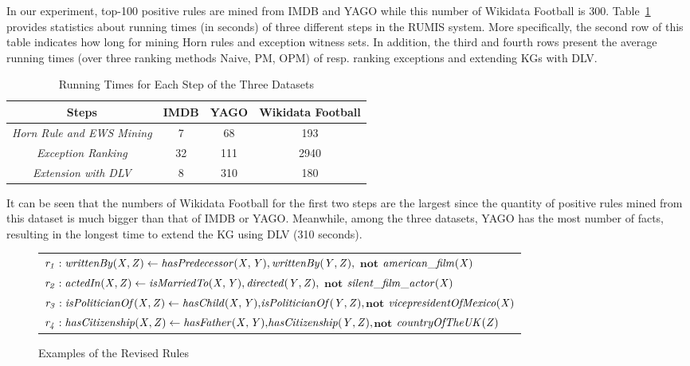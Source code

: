 In our experiment, top-100 positive rules are mined from IMDB and YAGO while this number of Wikidata Football is 300. Table~\ref{tab:run_time} provides statistics about running times (in seconds) of three different steps in the RUMIS system. More specifically, the second row of this table indicates how long for mining Horn rules and exception witness sets. In addition, the third and fourth rows present the average running times (over three ranking methods Naive, PM, OPM) of resp. ranking exceptions and extending KGs with DLV.

\begin{table}[ht]
\centering
\footnotesize{
\begin{tabular}{|c|ccc|}
\hline
\textbf{Steps} & \textbf{IMDB} & \textbf{YAGO} & \textbf{Wikidata Football}\\
\hline
 \textit{Horn Rule and EWS Mining} & 7 & 68 & 193\\
 \textit{Exception Ranking} & 32 & 111 & 2940\\
 \textit{Extension with DLV} & 8 & 310 & 180\\
 \hline 
\end{tabular}
}
\smallskip
\caption{Running Times for Each Step of the Three Datasets}
\label{tab:run_time}
\end{table}

It can be seen that the numbers of Wikidata Football for the first two steps are the largest since the quantity of positive rules mined from this dataset is much bigger than that of IMDB or YAGO. Meanwhile, among the three datasets, YAGO has the most number of facts, resulting in the longest time to extend the KG using DLV (310 seconds).

\begin{figure}[t]
    \centering
   
    \vspace{-.2cm}
    \begin{tabular}{l}
 {\scriptsize
        $\mathit{r_1: writtenBy(X, Z)}  \leftarrow
        \mathit{hasPredecessor(X, Y)},\mathit{writtenBy(Y, Z)},$ $ \textbf{not}$  $\mathit{american\_film(X)} $}\\        
       {\scriptsize 
$\mathit{r_2:  actedIn(X, Z)}  \leftarrow
        \mathit{isMarriedTo(X, Y)},\mathit{directed(Y, Z)},$ $ \textbf{not}$  $\mathit{silent\_film\_actor(X)} $} \\
          {\scriptsize 
$\mathit{r_3:  isPoliticianOf(X, Z)}  \leftarrow
        \mathit{hasChild(X, Y)}{,}\mathit{isPoliticianOf(Y, Z)}{,}$$ \textbf{not}$  $\mathit{vicepresidentOfMexico(X)} $} \\
          {\scriptsize 
$\mathit{r_4:  hasCitizenship(X, Z)}  \leftarrow
        \mathit{hasFather(X, Y)}{,}\mathit{hasCitizenship(Y, Z)}{,}$$ \textbf{not}$  $\mathit{countryOfTheUK(Z)} $} \\
 \end{tabular}            
    \caption{Examples of the Revised Rules}
 \label{fig:examplerules}
 \vspace{-.4cm}
\end{figure}

